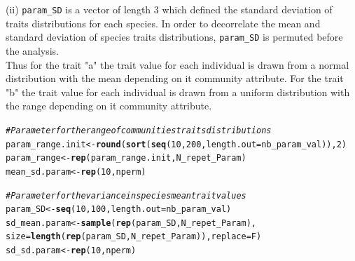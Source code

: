 \documentclass[12pt]{article}\usepackage[]{graphicx}\usepackage[]{color}
\makeatletter
\newcommand{\hlnum}[1]{\textcolor[rgb]{0.686,0.059,0.569}{#1}}%
\newcommand{\hlcom}[1]{\textcolor[rgb]{0.678,0.584,0.686}{\textit{#1}}}%
\newcommand{\hlstd}[1]{\textcolor[rgb]{0.345,0.345,0.345}{#1}}%
\newcommand{\hlkwb}[1]{\textcolor[rgb]{0.69,0.353,0.396}{#1}}%
\newcommand{\hlkwc}[1]{\textcolor[rgb]{0.333,0.667,0.333}{#1}}%
\newcommand{\hlkwd}[1]{\textcolor[rgb]{0.737,0.353,0.396}{\textbf{#1}}}%
\newenvironment{kframe}{%
 \def\at@end@of@kframe{}%
 \ifinner\ifhmode%
  \def\at@end@of@kframe{\end{minipage}}%
  \begin{minipage}{\columnwidth}%
 \fi\fi%
 \def\FrameCommand##1{\hskip\@totalleftmargin \hskip-\fboxsep
 \colorbox{shadecolor}{##1}\hskip-\fboxsep
     \hskip-\linewidth \hskip-\@totalleftmargin \hskip\columnwidth}%
 \MakeFramed {\advance\hsize-\width
   \@totalleftmargin\z@ \linewidth\hsize
   \@setminipage}}%
 {\par\unskip\endMakeFramed%
 \at@end@of@kframe}
\newenvironment{knitrout}{}{} %
\makeatother
\begin{document}
(ii) \texttt{param\_{}SD} is a vector of length 3 which defined the standard deviation of traits distributions for each species. In order to decorrelate the mean and standard deviation of species traits distributions, \texttt{param\_{}SD} is permuted before the analysis. 
\\

 Thus for the trait "a" the trait value for each individual is drawn from a normal distribution with the mean depending on it community attribute. For the trait "b" the trait value for each individual is drawn from a uniform distribution with the range depending on it community attribute.
 
\begin{knitrout}\small
{}\color{fgcolor}\begin{kframe}
\begin{alltt}
\hlcom{# Parameter for the range of communities traits distributions}
\hlstd{param_range.init} \hlkwb{<-} \hlkwd{round}\hlstd{(}\hlkwd{sort}\hlstd{(}\hlkwd{seq}\hlstd{(}\hlnum{10}\hlstd{,} \hlnum{200}\hlstd{,} \hlkwc{length.out} \hlstd{= nb_param_val)),} \hlnum{2}\hlstd{)}
\hlstd{param_range} \hlkwb{<-} \hlkwd{rep}\hlstd{(param_range.init, N_repet_Param)}
\hlstd{mean_sd.param} \hlkwb{<-} \hlkwd{rep}\hlstd{(}\hlnum{10}\hlstd{, nperm)}

\hlcom{# Parameter for the variance in species mean trait values}
\hlstd{param_SD} \hlkwb{<-} \hlkwd{seq}\hlstd{(}\hlnum{10}\hlstd{,} \hlnum{100}\hlstd{,}\hlkwc{length.out} \hlstd{= nb_param_val)}
\hlstd{sd_mean.param} \hlkwb{<-} \hlkwd{sample} \hlstd{(}\hlkwd{rep}\hlstd{(param_SD, N_repet_Param),}
       \hlkwc{size} \hlstd{=} \hlkwd{length}\hlstd{(}\hlkwd{rep}\hlstd{(param_SD, N_repet_Param)),} \hlkwc{replace} \hlstd{= F)}
\hlstd{sd_sd.param} \hlkwb{<-} \hlkwd{rep}\hlstd{(}\hlnum{10}\hlstd{, nperm)}
\end{alltt}
\end{kframe}
\end{knitrout}
\end{document}
